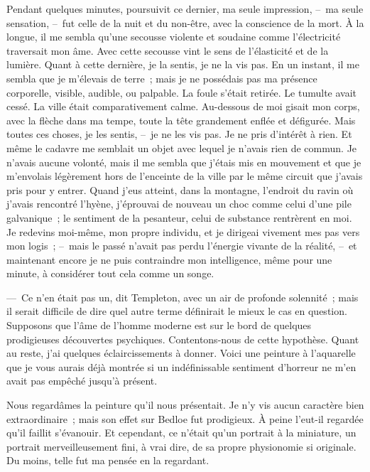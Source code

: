 \documentclass[french,twoside]{book} %
\begin{document}
Pendant quelques minutes, poursuivit ce dernier, ma seule impression, – ma seule sensation, – fut celle de la nuit et du non-être, avec la conscience de la mort. À la longue, il me sembla qu’une secousse violente et soudaine comme l’électricité traversait mon âme. Avec cette secousse vint le sens de l’élasticité et de la lumière. Quant à cette dernière, je la sentis, je ne la vis pas. En un instant, il me sembla que je m’élevais de terre ; mais je ne possédais pas ma présence corporelle, visible, audible, ou palpable. La foule s’était retirée. Le tumulte avait cessé. La ville était comparativement calme. Au-dessous de moi gisait mon corps, avec la flèche dans ma tempe, toute la tête grandement enflée et défigurée. Mais toutes ces choses, je les sentis, – je ne les vis pas. Je ne pris d’intérêt à rien. Et même le cadavre me semblait un objet avec lequel je n’avais rien de commun. Je n’avais aucune volonté, mais il me sembla que j’étais mis en mouvement et que je m’envolais légèrement hors de l’enceinte de la ville par le même circuit que j’avais pris pour y entrer. Quand j’eus atteint, dans la montagne, l’endroit du ravin où j’avais rencontré l’hyène, j’éprouvai de nouveau un choc comme celui d’une pile galvanique ; le sentiment de la pesanteur, celui de substance rentrèrent en moi. Je redevins moi-même, mon propre individu, et je dirigeai vivement mes pas vers mon logis ; – mais le passé n’avait pas perdu l’énergie vivante de la réalité, – et maintenant encore je ne puis contraindre mon intelligence, même pour une minute, à considérer tout cela comme un songe.\par
— Ce n’en était pas un, dit Templeton, avec un air de profonde solennité ; mais il serait difficile de dire quel autre terme définirait le mieux le cas en question. Supposons que l’âme de l’homme moderne est sur le bord de quelques prodigieuses découvertes psychiques. Contentons-nous de cette hypothèse. Quant au reste, j’ai quelques éclaircissements à donner. Voici une peinture à l’aquarelle que je vous aurais déjà montrée si un indéfinissable sentiment d’horreur ne m’en avait pas empêché jusqu’à présent.\par
Nous regardâmes la peinture qu’il nous présentait. Je n’y vis aucun caractère bien extraordinaire ; mais son effet sur Bedloe fut prodigieux. À peine l’eut-il regardée qu’il faillit s’évanouir. Et cependant, ce n’était qu’un portrait à la miniature, un portrait merveilleusement fini, à vrai dire, de sa propre physionomie si originale. Du moins, telle fut ma pensée en la regardant.\par
\end{document}
